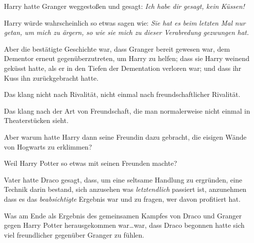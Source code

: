 Harry hatte Granger weggestoßen und gesagt: \emph{Ich habe dir gesagt, kein Küssen!}

Harry würde wahrscheinlich so etwas sagen wie: \emph{Sie hat es beim letzten Mal nur getan, um mich zu ärgern, so wie sie mich zu dieser Verabredung gezwungen hat.}

Aber die bestätigte Geschichte war, dass Granger bereit gewesen war, dem Dementor erneut gegenüberzutreten, um Harry zu helfen; dass sie Harry weinend geküsst hatte, als er in den Tiefen der Dementation verloren war; und dass ihr Kuss ihn zurückgebracht hatte.

Das klang nicht nach Rivalität, nicht einmal nach freundschaftlicher Rivalität.

Das klang nach der Art von Freundschaft, die man normalerweise nicht einmal in Theaterstücken sieht.

Aber warum hatte Harry dann seine Freundin dazu gebracht, die eisigen Wände von Hogwarts zu erklimmen?

Weil Harry Potter so etwas mit seinen Freunden machte?

Vater hatte Draco gesagt, dass, um eine seltsame Handlung zu ergründen, eine Technik darin bestand, sich anzusehen was \emph{letztendlich} passiert ist, anzunehmen dass es das \emph{beabsichtigte} Ergebnis war und zu fragen, wer davon profitiert hat.

Was am Ende als Ergebnis des gemeinsamen Kampfes von Draco und Granger gegen Harry Potter herausgekommen war…war, dass Draco begonnen hatte sich viel freundlicher gegenüber Granger zu fühlen.

